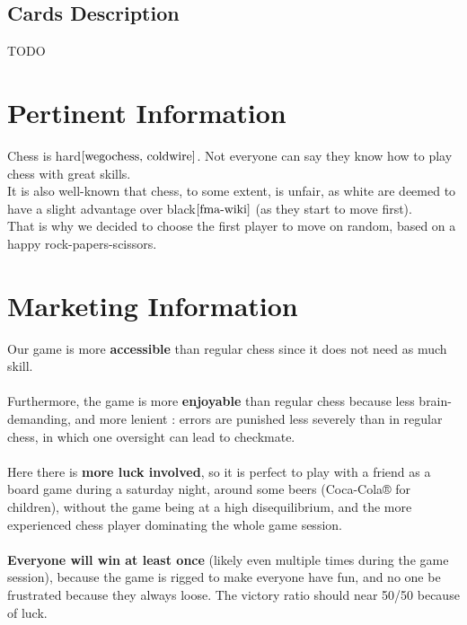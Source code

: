\documentclass[12pt]{article}
\begin{document}
        \subsection{Cards Description}
            TODO
    
    \section{Pertinent Information}
        Chess is hard$\cite{wegochess, coldwire}$. Not everyone can say they know how to play chess with great skills.
        \\It is also well-known that chess, to some extent, is unfair, as white are deemed to have a slight advantage over black$\cite{fma-wiki}$  (as they start to move first).
        \\That is why we decided to choose the first player to move on random, based on a happy rock-papers-scissors.
    
    \section{Marketing Information}
        Our game is more \textbf{accessible} than regular chess since it does not need as much skill.
        \\\\Furthermore, the game is more \textbf{enjoyable} than regular chess because less brain-demanding, and more lenient : errors are punished less severely than in regular chess, in which one oversight can lead to checkmate.
        \\\\Here there is \textbf{more luck involved}, so it is perfect to play with a friend as a board game during a saturday night, around some beers (Coca-Cola® for children), without the game being at a high disequilibrium, and the more experienced chess player dominating the whole game session.
        \\\\\textbf{Everyone will win at least once} (likely even multiple times during the game session), because the game is rigged to make everyone have fun, and no one be frustrated because they always loose. The victory ratio should near 50/50 because of luck.

    
\end{document}

